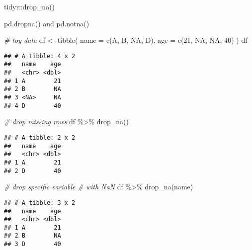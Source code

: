 \documentclass[
]{book}
\newenvironment{Shaded}{\begin{snugshade}}{\end{snugshade}}
\newcommand{\AttributeTok}[1]{\textcolor[rgb]{0.77,0.63,0.00}{#1}}
\newcommand{\CommentTok}[1]{\textcolor[rgb]{0.56,0.35,0.01}{\textit{#1}}}
\newcommand{\ConstantTok}[1]{\textcolor[rgb]{0.00,0.00,0.00}{#1}}
\newcommand{\DecValTok}[1]{\textcolor[rgb]{0.00,0.00,0.81}{#1}}
\newcommand{\FunctionTok}[1]{\textcolor[rgb]{0.00,0.00,0.00}{#1}}
\newcommand{\NormalTok}[1]{#1}
\newcommand{\OtherTok}[1]{\textcolor[rgb]{0.56,0.35,0.01}{#1}}
\newcommand{\SpecialCharTok}[1]{\textcolor[rgb]{0.00,0.00,0.00}{#1}}
\newcommand{\StringTok}[1]{\textcolor[rgb]{0.31,0.60,0.02}{#1}}
\begin{document}
tidyr::drop\_na()

pd.dropna() and pd.notna()

\begin{Shaded}
\begin{Highlighting}[]
\CommentTok{\# toy data}
\NormalTok{df }\OtherTok{\textless{}{-}} \FunctionTok{tibble}\NormalTok{(}
  \AttributeTok{name =} \FunctionTok{c}\NormalTok{(}\StringTok{\textquotesingle{}A\textquotesingle{}}\NormalTok{, }\StringTok{\textquotesingle{}B\textquotesingle{}}\NormalTok{,}
           \ConstantTok{NA}\NormalTok{, }\StringTok{\textquotesingle{}D\textquotesingle{}}\NormalTok{),}
  \AttributeTok{age  =}  \FunctionTok{c}\NormalTok{(}\DecValTok{21}\NormalTok{, }\ConstantTok{NA}\NormalTok{,}
           \ConstantTok{NA}\NormalTok{, }\DecValTok{40}\NormalTok{)}
\NormalTok{)}
\NormalTok{df}
\end{Highlighting}
\end{Shaded}

\begin{verbatim}
## # A tibble: 4 x 2
##   name    age
##   <chr> <dbl>
## 1 A        21
## 2 B        NA
## 3 <NA>     NA
## 4 D        40
\end{verbatim}

\begin{Shaded}
\begin{Highlighting}[]
\CommentTok{\# drop missing rows}
\NormalTok{df }\SpecialCharTok{\%\textgreater{}\%} \FunctionTok{drop\_na}\NormalTok{()}
\end{Highlighting}
\end{Shaded}

\begin{verbatim}
## # A tibble: 2 x 2
##   name    age
##   <chr> <dbl>
## 1 A        21
## 2 D        40
\end{verbatim}

\begin{Shaded}
\begin{Highlighting}[]
\CommentTok{\# drop specific variable}
\CommentTok{\# with NaN}
\NormalTok{df }\SpecialCharTok{\%\textgreater{}\%} \FunctionTok{drop\_na}\NormalTok{(name)}
\end{Highlighting}
\end{Shaded}

\begin{verbatim}
## # A tibble: 3 x 2
##   name    age
##   <chr> <dbl>
## 1 A        21
## 2 B        NA
## 3 D        40
\end{verbatim}
\end{document}
